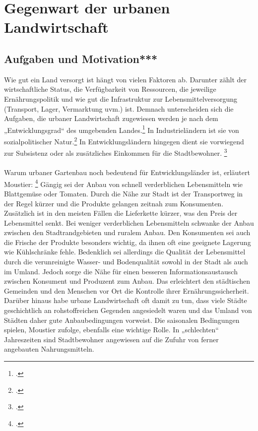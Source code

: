 \documentclass{scrartcl}
\begin{document}
\section{Gegenwart der urbanen Landwirtschaft}
\subsection{Aufgaben und Motivation***}

Wie gut ein Land versorgt ist hängt von vielen Faktoren ab. Darunter zählt der wirtschaftliche Status, die Verfügbarkeit von Ressourcen, die jeweilige Ernährungspolitik und wie gut die Infrastruktur zur Lebensmittelversorgung (Transport, Lager, Vermarktung uvm.) ist. Demnach unterscheiden sich die Aufgaben, die urbaner Landwirtschaft zugewiesen werden je nach dem „Entwicklungsgrad“ des umgebenden Landes.\footcite{Smit2001UrbanToday} In Industrieländern ist sie von sozialpolitischer Natur.\footcites[][S. 21]{Berges2014UrbaneStadt}[S.26f]{Smit2001UrbanToday} In Entwicklungsländern hingegen dient sie vorwiegend zur Subsistenz oder als zusätzliches Einkommen für die Stadtbewohner. \footcites[Vgl.][S.75]{Nugent2000TheEconomies}[S.26f]{Smit2001UrbanToday}\\
\\
Warum urbaner Gartenbau noch bedeutend für Entwicklungsländer ist, erläutert Moustier: \footcites[Vgl.][S.6ff]{Moustier2007UrbanSupplier} Gängig sei der Anbau von schnell verderblichen Lebensmitteln wie Blattgemüse oder Tomaten. Durch die Nähe zur Stadt ist der Transportweg in der Regel kürzer und die Produkte gelangen zeitnah zum Konsumenten. Zusätzlich ist in den meisten Fällen die Lieferkette kürzer, was den Preis der Lebensmittel senkt. Bei weniger verderblichen Lebensmitteln schwanke der Anbau zwischen den Stadtrandgebieten und ruralem Anbau. Den Konsumenten sei auch die Frische der Produkte besonders wichtig, da ihnen oft eine geeignete Lagerung wie Kühlschränke fehle. Bedenklich sei allerdings die Qualität der Lebensmittel durch die verunreinigte Wasser- und Bodenqualität sowohl in der Stadt als auch im Umland. Jedoch sorge die Nähe für einen besseren Informationsaustausch zwischen Konsument und Produzent zum Anbau. Das erleichtert den städtischen Gemeinden und den Menschen vor Ort die Kontrolle ihrer Ernährungssicherheit. Darüber hinaus habe urbane Landwirtschaft oft damit zu tun, dass viele Städte geschichtlich an rohstoffreichen Gegenden angesiedelt waren und das Umland von Städten daher gute Anbaubedingungen vorweist. Die saisonalen Bedingungen spielen, Moustier zufolge, ebenfalls eine wichtige Rolle. In „schlechten“ Jahreszeiten sind Stadtbewohner angewiesen auf die Zufuhr von ferner angebauten Nahrungsmitteln. \\
\end{document}
